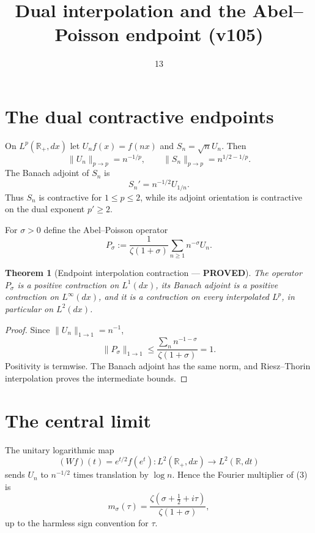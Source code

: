 \documentclass[11pt]{article}
\title{Dual interpolation and the Abel--Poisson endpoint (v105)}
\date{13}
\newcommand{\PROVED}{\textcolor{green!40!black}{\textbf{PROVED}}}
\newtheorem{theorem}{Theorem}
\begin{document}
\maketitle

\section{The dual contractive endpoints}

On $L^p(\mathbb R_+,dx)$ let $U_nf(x)=f(nx)$ and
$S_n=\sqrt nU_n$.  Then
\begin{equation}
 \|U_n\|_{p\to p}=n^{-1/p},\qquad
 \|S_n\|_{p\to p}=n^{1/2-1/p}.                       \tag{1}
\end{equation}
The Banach adjoint of $S_n$ is
\begin{equation}
                  S_n'=n^{-1/2}U_{1/n}.              \tag{2}
\end{equation}
Thus $S_n$ is contractive for $1\le p\le2$, while its adjoint orientation
is contractive on the dual exponent $p'\ge2$.

For $\sigma>0$ define the Abel--Poisson operator
\begin{equation}
 P_\sigma:=\frac1{\zeta(1+\sigma)}
                \sum_{n\ge1}n^{-\sigma}U_n.          \tag{3}
\end{equation}

\begin{theorem}[Endpoint interpolation contraction --- \PROVED]
The operator $P_\sigma$ is a positive contraction on $L^1(dx)$, its Banach
adjoint is a positive contraction on $L^\infty(dx)$, and it is a contraction
on every interpolated $L^p$, in particular on $L^2(dx)$.
\end{theorem}

\begin{proof}
Since $\|U_n\|_{1\to1}=n^{-1}$,
\[
 \|P_\sigma\|_{1\to1}
 \le\frac{\sum_n n^{-1-\sigma}}{\zeta(1+\sigma)}=1.
\]
Positivity is termwise.  The Banach adjoint has the same norm, and
Riesz--Thorin interpolation proves the intermediate bounds.
\end{proof}

\section{The central limit}

The unitary logarithmic map
\[
 (Wf)(t)=e^{t/2}f(e^t):L^2(\mathbb R_+,dx)\longrightarrow L^2(\mathbb R,dt)
\]
sends $U_n$ to $n^{-1/2}$ times translation by $\log n$.  Hence the Fourier
multiplier of (3) is
\begin{equation}
 m_\sigma(\tau)=
 \frac{\zeta(\sigma+\tfrac12+i\tau)}{\zeta(1+\sigma)},          \tag{4}
\end{equation}
up to the harmless sign convention for $\tau$.
\end{document}
